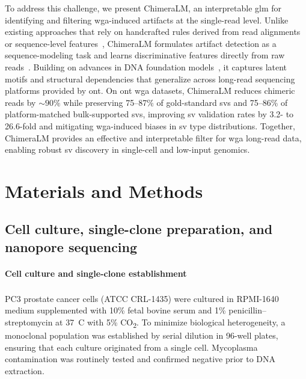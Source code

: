 \documentclass[pdflatex,lineno]{sn-jnl}%
\newif\ifrevisedtext
\newcommand{\chg}[1]{\ifrevisedtext\textcolor{revcolor}{#1}\else#1\fi}
\begin{document}
To address this challenge, we present ChimeraLM, an interpretable \gls{glm} for identifying and filtering \gls{wga}-induced artifacts at the single-read level.
Unlike existing approaches that rely on handcrafted rules derived from read alignments or sequence-level features~\cite{kiguchi2021longread,lu2023exploration,agyabeng2025evaluating}, ChimeraLM formulates artifact detection as a sequence-modeling task and learns discriminative features directly from raw reads~\cite{li2024deepchopper}.
Building on advances in DNA foundation models~\cite{nguyen2023hyenadna,dalla2025nucleotide,zhou2023dnabert,consens2023transformers}, it captures latent motifs and structural dependencies that generalize across long-read sequencing platforms provided by \gls{ont}.
On \gls{ont} \gls{wga} datasets, ChimeraLM reduces chimeric reads by ${\sim}90\%$ \chg{while preserving 75--87\% of gold-standard \glspl{sv} and 75--86\% of platform-matched bulk-supported \glspl{sv}, improving \gls{sv} validation rates by 3.2- to 26.6-fold} and mitigating \gls{wga}-induced biases in \gls{sv} type distributions.
Together, ChimeraLM provides an effective and interpretable filter for \gls{wga} long-read data, enabling robust \gls{sv} discovery in single-cell and low-input genomics.

\section*{Materials and Methods}\label{sec:methods}

\subsection*{Cell culture, single-clone preparation, and nanopore sequencing}

\paragraph{Cell culture and single-clone establishment}
PC3 prostate cancer cells (ATCC\textsuperscript{\textregistered} CRL-1435\texttrademark) were cultured in RPMI-1640 medium supplemented with 10\% fetal bovine serum and 1\% penicillin--streptomycin at 37~\textdegree C with 5\% CO\textsubscript{2}. To minimize biological heterogeneity, a monoclonal population was established by serial dilution in 96-well plates, ensuring that each culture originated from a single cell. Mycoplasma contamination was routinely tested and confirmed negative prior to DNA extraction.
\end{document}
